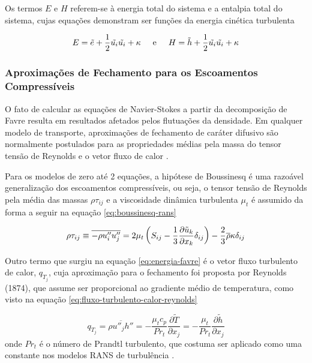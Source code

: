Os termos $E$ e $H$ referem-se à energia total do sistema e a entalpia total do sistema, cujas equações demonstram ser funções da energia cinética turbulenta

\begin{equation}
	E = \Tilde{e} + \frac{1}{2}\Tilde{u_i}\Tilde{u_i} + \kappa 
	\hspace{0.5cm} 
	\text{e} 
	\hspace{0.5cm} 
	H = \Tilde{h} + \frac{1}{2}\Tilde{u_i}\Tilde{u_i} + \kappa
\end{equation} 

\subsubsection{Aproximações de Fechamento para os Escoamentos Compressíveis}

O fato de calcular as equações de Navier-Stokes a partir da decomposição de Favre resulta em resultados afetados pelos flutuações da densidade. Em qualquer modelo de transporte, aproximações de fechamento de caráter difusivo são normalmente postulados para as propriedades médias pela massa do tensor tensão de Reynolds e o vetor fluxo de calor \cite{Wilcox2006}. 

Para os modelos de zero até 2 equações, a hipótese de Boussinesq é uma razoável generalização dos escoamentos compressíveis, ou seja, o tensor tensão de Reynolds pela média das massas $\rho\tau_{ij}$ e a viscosidade dinâmica turbulenta $\mu_t$ é assumido da forma a seguir na equação \ref{eq:boussinesq-rans}

\begin{equation}
	\label{eq:boussinesq-rans}
	\rho\tau_{ij} \equiv \overline{-\rho u''_{i}u''_{j}} = 2\mu_t \left(S_{ij} - \frac{1}{3}\frac{\partial \Tilde{u}_k}{\partial x_k}\delta_{ij}\right) - \frac{2}{3}\overline{\rho}\kappa\delta_{ij}
\end{equation}

Outro termo que surgiu na equação \ref{eq:energia-favre} é o vetor fluxo turbulento de calor, $q_{T_j}$, cuja aproximação para o fechamento foi proposta por Reynolds (1874), que assume ser proporcional ao gradiente médio de temperatura, como visto na equação \ref{eq:fluxo-turbulento-calor-reynolds} 

\begin{equation}
	\label{eq:fluxo-turbulento-calor-reynolds}
	q_{T_j} = \overline{\rho u''_j h''} = -\frac{\mu_t c_p}{Pr_t}\frac{\partial \tilde{T}}{\partial x_j} = -\frac{\mu_t}{Pr_t}\frac{\partial \tilde{h}}{\partial x_j}
\end{equation}
%
onde $Pr_t$ é o número de Prandtl turbulento, que costuma ser aplicado como uma constante nos modelos RANS de turbulência \cite{Wilcox2006}.

